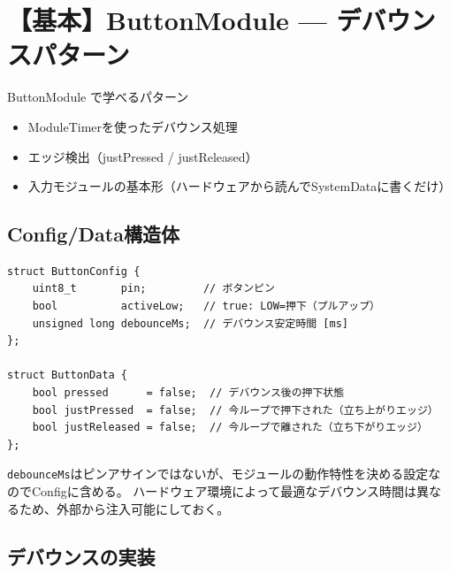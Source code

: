 \section{【基本】ButtonModule — デバウンスパターン}

\begin{patternbox}{ButtonModule で学べるパターン}
\begin{itemize}
    \item ModuleTimerを使ったデバウンス処理
    \item エッジ検出（justPressed / justReleased）
    \item 入力モジュールの基本形（ハードウェアから読んでSystemDataに書くだけ）
\end{itemize}
\end{patternbox}

\subsection{Config/Data構造体}

\begin{lstlisting}[style=cppstyle, caption={ButtonModule.h — Config/Data}]
struct ButtonConfig {
    uint8_t       pin;         // ボタンピン
    bool          activeLow;   // true: LOW=押下（プルアップ）
    unsigned long debounceMs;  // デバウンス安定時間 [ms]
};

struct ButtonData {
    bool pressed      = false;  // デバウンス後の押下状態
    bool justPressed  = false;  // 今ループで押下された（立ち上がりエッジ）
    bool justReleased = false;  // 今ループで離された（立ち下がりエッジ）
};
\end{lstlisting}

\begin{pointbox}[Configに動作パラメータを含める]
\texttt{debounceMs}はピンアサインではないが、モジュールの動作特性を決める設定なのでConfigに含める。
ハードウェア環境によって最適なデバウンス時間は異なるため、外部から注入可能にしておく。
\end{pointbox}

\subsection{デバウンスの実装}

